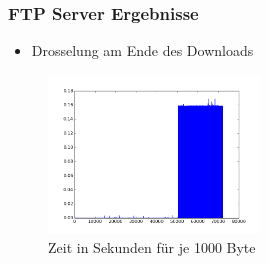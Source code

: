 \documentclass[handout]{beamer}
\begin{document}
\begin{frame}
\frametitle{FTP Server Ergebnisse}
\begin{itemize}
\item Drosselung am Ende des Downloads
\end{itemize}
\begin{figure}
\centering
\includegraphics[width=0.5\textwidth]{seconds_ftp.png}
\caption{Zeit in Sekunden für je 1000 Byte}
\end{figure}
\end{frame}
\end{document}
